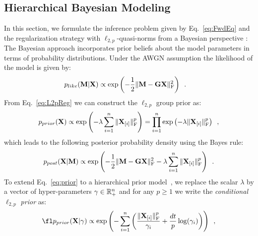 \subsection{Hierarchical Bayesian Modeling}
\label{sub:HBM}

In this section, we formulate the inference problem given by Eq.~\ref{eq:FwdEq}
 and the regularization strategy with $\ell_{2,p}$-quasi-norms from a Bayesian perspective \cite{KaSo05,Lu14}: The Bayesian approach incorporates prior beliefs about the model parameters in terms of probability distributions. Under the AWGN assumption the likelihood of the model is given by:
\begin{eqnarray} \label{eq:like}
p_{like}(\mathbf{M}|\mathbf{X}) &\propto \exp \left( - \frac{1}{2} \|{\mathbf{M} - \mathbf{G} \mathbf{X}}\|_{\rm F}^2 \right) \enspace.
\end{eqnarray}
From Eq.~\ref{eq:L2pReg} we can construct the $\ell_{2,p}$ group prior as:
 \begin{equation} \label{eq:prior}
p_{prior}(\mathbf{X}) \propto \exp \left( - \lambda \sum_{i=1}^n \|{\mathbf{X}_{[i]}}\|_{\rm F}^p \right)
= \prod_{i=1}^n \exp \left( - \lambda \|{\mathbf{X}_{[i]}}\|_{\rm F}^p \right) \enspace,
\end{equation}
which leads to the following posterior probability density using the Bayes rule:
\begin{equation} \label{eq:post}
p_{post}(\mathbf{X}|\mathbf{M}) \propto \exp \left( - \frac{1}{2} \|{\mathbf{M} - \mathbf{G} \mathbf{X}}\|_{\rm F}^2 - \lambda \sum_{i=1}^n \|{\mathbf{X}_{[i]}}\|_{\rm F}^p \right) \enspace.
\end{equation}
To extend Eq.~\ref{eq:prior} to a hierarchical prior model~\cite{mackay2003information}, we replace the scalar $\lambda$ by a vector of hyper-parameters $\gamma \in \mathbb{R}^{n}_+$ and for any $p \geq 1$ we write the \emph{conditional $\ell_{2,p}$ prior} as:
\begin{equation} \label{eq:condprior}
\fl \hiprior
\propto \exp \left( - \sum_{i=1}^n \left( \frac{\fronorm{\bfX_{[i]}}^p}{\gamma_i} + \frac{d t}{p} \log(\gamma_i)\right)\right) \enspace,
\end{equation}

